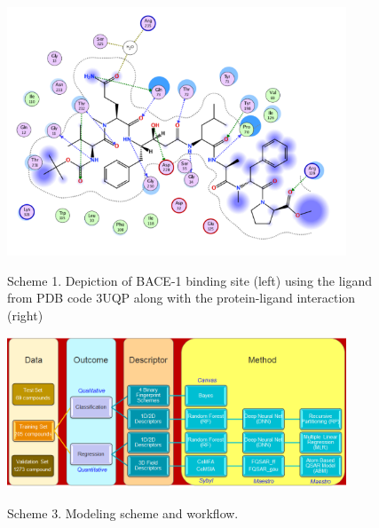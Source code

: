 \begin{figure}
  \centering
  \includegraphics[width=0.9\textwidth]{Images/bace_scheme1B.png}
  \label{fig:bace_scheme1b}
  \caption{Scheme 1.  Depiction of BACE-1 binding site (left) using the ligand from PDB code 3UQP along with the protein-ligand interaction (right)}
\end{figure}


\begin{figure}
  \centering
  \includegraphics[width=0.9\textwidth]{Images/bace_scheme3.png}
  \label{fig:bace_scheme2}
  \caption{Scheme 3.  Modeling scheme and workflow.}
\end{figure}